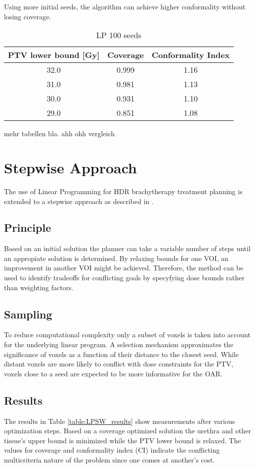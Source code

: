 \documentclass[USenglish,twocolumn]{article}
\begin{document}
Using more initial seeds, the algorithm can achieve higher conformality without losing coverage.

				\begin{table}[h]
			\centering		
		 	\caption{LP 100 seeds}
		 	\label{table:LP_results100}
			\begin{tabular}{ccc}
			PTV lower bound [Gy] 	& Coverage 	& Conformality Index\\	\hline
				32.0 	& 0.999		& 1.16\\
				31.0 	& 0.981 	& 1.13\\
				30.0 	& 0.931		& 1.10\\		
				29.0 	& 0.851		& 1.08\\
			\end{tabular}
		\end{table}

mehr tabellen bla. ahh ohh vergleich		
		
\section{Stepwise Approach}
The use of Linear Programming for HDR brachytherapy treatment planning is extended to a stepwise approach as described in \citep{3}.

	\subsection{Principle}
		Based on an initial solution the planner can take a variable number of steps until an appropiate solution is determined. By relaxing bounds for one VOI, an improvement in another VOI might be achieved. Therefore, the method can be used to identify tradeoffs for conflicting goals by specyfying dose bounds rather than weighting factors.

	\subsection{Sampling}
		To reduce computational complexity only a subset of voxels is taken into account for the underlying linear program. A selection mechanism approximates the significance of voxels as a function of their distance to the closest seed. While distant voxels are more likely to conflict with dose constraints for the PTV, voxels close to a seed are expected to be more informative for the OAR.  
	
	\subsection{Results}
		The results in Table \ref{table:LPSW_results} show measurements after various optimization steps. Based on a coverage optimized solution the urethra and other tissue's upper bound is minimized while the PTV lower bound is relaxed. The values for coverage and conformality index (CI) indicate the conflicting multicriteria nature of the problem since one comes at another's cost.
		
\end{document}
